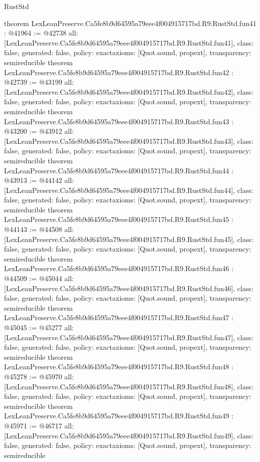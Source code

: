 \begin{lexlean}{RustStd}
\begin{coremodule}
{}
theorem LexLeanPreserve.Ca5fe8b9d64595a79eee4f004915717bd.R9.RustStd.fun41 : @41964 := @42738 {
  all: [LexLeanPreserve.Ca5fe8b9d64595a79eee4f004915717bd.R9.RustStd.fun41],
  class: false,
  generated: false,
  policy: exact{axioms: [Quot.sound, propext]},
  transparency: semireducible
}
theorem LexLeanPreserve.Ca5fe8b9d64595a79eee4f004915717bd.R9.RustStd.fun42 : @42739 := @43199 {
  all: [LexLeanPreserve.Ca5fe8b9d64595a79eee4f004915717bd.R9.RustStd.fun42],
  class: false,
  generated: false,
  policy: exact{axioms: [Quot.sound, propext]},
  transparency: semireducible
}
theorem LexLeanPreserve.Ca5fe8b9d64595a79eee4f004915717bd.R9.RustStd.fun43 : @43200 := @43912 {
  all: [LexLeanPreserve.Ca5fe8b9d64595a79eee4f004915717bd.R9.RustStd.fun43],
  class: false,
  generated: false,
  policy: exact{axioms: [Quot.sound, propext]},
  transparency: semireducible
}
theorem LexLeanPreserve.Ca5fe8b9d64595a79eee4f004915717bd.R9.RustStd.fun44 : @43913 := @44142 {
  all: [LexLeanPreserve.Ca5fe8b9d64595a79eee4f004915717bd.R9.RustStd.fun44],
  class: false,
  generated: false,
  policy: exact{axioms: [Quot.sound, propext]},
  transparency: semireducible
}
theorem LexLeanPreserve.Ca5fe8b9d64595a79eee4f004915717bd.R9.RustStd.fun45 : @44143 := @44508 {
  all: [LexLeanPreserve.Ca5fe8b9d64595a79eee4f004915717bd.R9.RustStd.fun45],
  class: false,
  generated: false,
  policy: exact{axioms: [Quot.sound, propext]},
  transparency: semireducible
}
theorem LexLeanPreserve.Ca5fe8b9d64595a79eee4f004915717bd.R9.RustStd.fun46 : @44509 := @45044 {
  all: [LexLeanPreserve.Ca5fe8b9d64595a79eee4f004915717bd.R9.RustStd.fun46],
  class: false,
  generated: false,
  policy: exact{axioms: [Quot.sound, propext]},
  transparency: semireducible
}
theorem LexLeanPreserve.Ca5fe8b9d64595a79eee4f004915717bd.R9.RustStd.fun47 : @45045 := @45277 {
  all: [LexLeanPreserve.Ca5fe8b9d64595a79eee4f004915717bd.R9.RustStd.fun47],
  class: false,
  generated: false,
  policy: exact{axioms: [Quot.sound, propext]},
  transparency: semireducible
}
theorem LexLeanPreserve.Ca5fe8b9d64595a79eee4f004915717bd.R9.RustStd.fun48 : @45278 := @45970 {
  all: [LexLeanPreserve.Ca5fe8b9d64595a79eee4f004915717bd.R9.RustStd.fun48],
  class: false,
  generated: false,
  policy: exact{axioms: [Quot.sound, propext]},
  transparency: semireducible
}
theorem LexLeanPreserve.Ca5fe8b9d64595a79eee4f004915717bd.R9.RustStd.fun49 : @45971 := @46717 {
  all: [LexLeanPreserve.Ca5fe8b9d64595a79eee4f004915717bd.R9.RustStd.fun49],
  class: false,
  generated: false,
  policy: exact{axioms: [Quot.sound, propext]},
  transparency: semireducible
}
\end{coremodule}
\end{lexlean}
